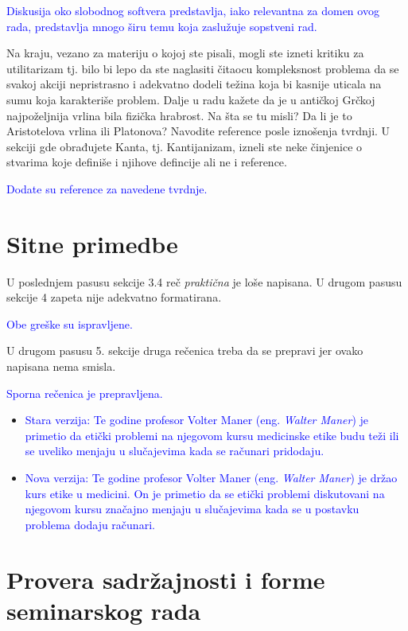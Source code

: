 \documentclass[a4paper]{report}
\newcommand{\odgovor}[1]{\textcolor{blue}{#1}}
\begin{document}
\odgovor{Diskusija oko slobodnog softvera predstavlja, iako relevantna za domen ovog rada, predstavlja mnogo širu temu koja zaslužuje sopstveni rad.}

Na kraju, vezano za materiju o kojoj ste pisali, mogli ste izneti kritiku za utilitarizam tj. 
bilo bi lepo da ste naglasiti čitaocu kompleksnost problema da se svakoj akciji 
nepristrasno i adekvatno dodeli težina koja bi kasnije uticala na sumu koja karakteriše problem.
Dalje u radu kažete da je u antičkoj Grčkoj najpoželjnija vrlina bila fizička hrabrost. Na šta se tu misli? Da li
je to Aristotelova vrlina ili Platonova? Navodite reference posle iznošenja tvrdnji. U sekciji gde obrađujete Kanta, tj. Kantijanizam, izneli ste neke činjenice o stvarima koje definiše i njihove defincije ali ne i reference.

\odgovor{Dodate su reference za navedene tvrdnje.}

\section{Sitne primedbe}
U poslednjem pasusu sekcije 3.4 reč \textit{praktična} je loše napisana.
U drugom pasusu sekcije 4 zapeta nije adekvatno formatirana.

\odgovor{Obe greške su ispravljene.}

U drugom pasusu 5. sekcije druga rečenica treba da se prepravi jer ovako napisana nema smisla.

\odgovor{Sporna rečenica je prepravljena.}
\begin{itemize}
\item \odgovor{Stara verzija:
Te godine profesor Volter Maner (eng. \textit{Walter Maner}) je primetio da etički problemi na njegovom kursu medicinske etike budu teži ili se uveliko menjaju u slučajevima kada se računari pridodaju.}
\item \odgovor{Nova verzija:
Te godine profesor Volter Maner (eng. \textit{Walter Maner}) je držao kurs etike u medicini. On je primetio da se etički problemi diskutovani na njegovom kursu značajno menjaju u slučajevima kada se u postavku problema dodaju računari.}

\end{itemize}

\section{Provera sadržajnosti i forme seminarskog rada}
\end{document}
